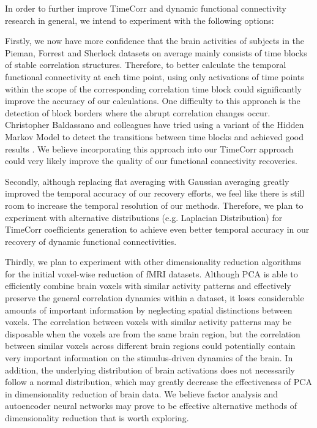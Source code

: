 \documentclass[11pt]{article}
\begin{document}
In order to further improve TimeCorr and dynamic functional connectivity research in general, we intend to experiment with the following options:

Firstly, we now have more confidence that the brain activities of subjects in the Pieman, Forrest and Sherlock datasets on average mainly consists of time blocks of stable correlation structures. Therefore, to better calculate the temporal functional connectivity at each time point, using only activations of time points within the scope of the corresponding correlation time block could significantly improve the accuracy of our calculations. One difficulty to this approach is the detection of block borders where the abrupt correlation changes occur. Christopher Baldassano and colleagues have tried using a variant of the Hidden Markov Model to detect the transitions between time blocks and achieved good results \citep{Baldassano2016}. We believe incorporating this approach into our TimeCorr approach could very likely improve the quality of our functional connectivity recoveries.

Secondly, although replacing flat averaging with Gaussian averaging greatly improved the temporal accuracy of our recovery efforts, we feel like there is still room to increase the temporal resolution of our methods. Therefore, we plan to experiment with alternative distributions (e.g. Laplacian Distribution) for TimeCorr coefficients generation to achieve even better temporal accuracy in our recovery of dynamic functional connectivities.

Thirdly, we plan to experiment with other dimensionality reduction algorithms for the initial voxel-wise reduction of fMRI datasets. Although PCA is able to efficiently combine brain voxels with similar activity patterns and effectively preserve the general correlation dynamics within a dataset, it loses considerable amounts of important information by neglecting spatial distinctions between voxels. The correlation between voxels with similar activity patterns may be disposable when the voxels are from the same brain region, but the correlation between similar voxels across different brain regions could potentially contain very important information on the stimulus-driven dynamics of the brain. In addition, the underlying distribution of brain activations does not necessarily follow a normal distribution, which may greatly decrease the effectiveness of PCA in dimensionality reduction of brain data. We believe factor analysis and autoencoder neural networks may prove to be effective alternative methods of dimensionality reduction that is worth exploring.
\end{document}
